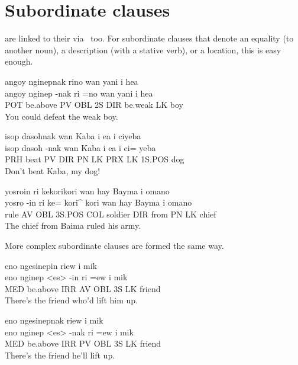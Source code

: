 \section{Subordinate clauses}
 are linked to their  via \LK~too.
For subordinate clauses that denote an equality (to another noun), a description (with a stative verb), or a location, this is easy enough.
\begin{examples}
	\ex
	\label{ex:can_beat}
	\script angoy nginepnak rino wan yani i hea \\
	\bits angoy nginep -nak ri =no wan yani i hea \\
	\gloss POT be.above PV OBL 2S DIR be.weak LK boy \\
	\tr You could defeat the weak boy.

	\ex
	\label{ex:dont_beat_kaba}
	\script isop dasohnak wan Kaba i ea i ciyeba \\
	\bits isop dasoh -nak wan Kaba i ea i ci= yeba \\
	\gloss PRH beat PV DIR PN LK PRX LK 1S.POS dog \\
	\tr Don't beat Kaba, my dog!

	\ex
	\label{ex:from_bayma}
	\script yosroin ri kekorikori wan hay Bayma i omano \\
	\bits yosro -in ri ke= kori^ kori wan hay Bayma i omano \\
	\gloss rule AV OBL 3S.POS COL soldier DIR from PN LK chief \\
	\tr The chief from Baima ruled his army.
\end{examples}
More complex subordinate clauses are formed the same way.
\begin{examples}
	\ex
	\label{ex:there_is_his_friend}
	\script eno ngesinepin riew i mik \\
	\bits eno nginep <es> -in ri =ew i mik \\
	\gloss MED be.above IRR AV OBL 3S LK friend \\
	\tr There's the friend who'd lift him up.

	\ex
	\label{ex:there_is_his_friends}
	\script eno ngesinepnak riew i mik \\
	\bits eno nginep <es> -nak ri =ew i mik \\
	\gloss MED be.above IRR PV OBL 3S LK friend \\
	\tr There's the friend he'll lift up.
\end{examples}

